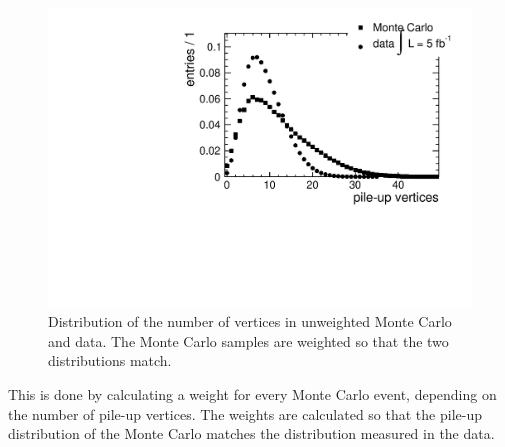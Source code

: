 \begin{figure}[htb]
    \centering
    \includegraphics[width=.7\textwidth]{images/pdf/pile_up}

    \caption{Distribution of the number of vertices in unweighted Monte Carlo and data. The
    Monte Carlo samples are weighted so that the two distributions match.}
    \label{fig:pile_up}
\end{figure}

This is done by calculating a weight for every Monte Carlo event, depending
on the number of pile-up vertices.
The weights are calculated so that the pile-up distribution of the Monte
Carlo matches the distribution measured in the data.
